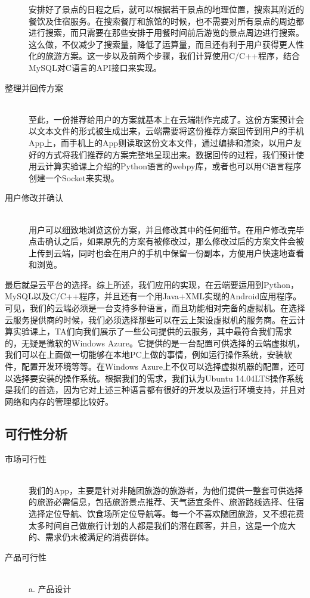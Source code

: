 \documentclass[12pt,a4paper]{article}
\begin{document}
\begin{CJK}{UTF8}{gbsn}
\begin{description}
	安排好了景点的日程之后，就可以根据若干景点的地理位置，搜索其附近的餐饮及住宿服务。在搜索餐厅和旅馆的时候，也不需要对所有景点的周边都进行搜索，而只需要在那些安排于用餐时间前后游览的景点周边进行搜索。这么做，不仅减少了搜索量，降低了运算量，而且还有利于用户获得更人性化的旅游方案。这一步以及前两个步骤，我们计算使用C{\slash}C++程序，结合MySQL对C语言的API接口来实现。
	\item[整理并回传方案] \hfill \\
	至此，一份推荐给用户的方案就基本上在云端制作完成了。这份方案预计会以文本文件的形式被生成出来，云端需要将这份推荐方案回传到用户的手机App上，而手机上的App则读取这份文本文件，通过编排和渲染，以用户友好的方式将我们推荐的方案完整地呈现出来。数据回传的过程，我们预计使用云计算实验课上介绍的Python语言的webpy库，或者也可以用C语言程序创建一个Socket来实现。
	\item[用户修改并确认] \hfill \\
	用户可以细致地浏览这份方案，并且修改其中的任何细节。在用户修改完毕点击确认之后，如果原先的方案有被修改过，那么修改过后的方案文件会被上传到云端，同时也会在用户的手机中保留一份副本，方便用户快速地查看和浏览。
	\end{description}

	最后就是云平台的选择。综上所述，我们应用的实现，在云端要运用到Python，MySQL以及C{\slash}C++程序，并且还有一个用Java+XML实现的Android应用程序。可见，我们的云端必须是一台支持多种语言，而且功能相对完备的虚拟机。在选择云服务提供商的时候，我们必须选择那些可以在云上架设虚拟机的服务商。在云计算实验课上，TA们向我们展示了一些公司提供的云服务，其中最符合我们需求的，无疑是微软的Windows Azure。它提供的是一台配置可供选择的云端虚拟机，我们可以在上面做一切能够在本地PC上做的事情，例如运行操作系统，安装软件，配置开发环境等等。在Windows Azure上不仅可以选择虚拟机器的配置，还可以选择要安装的操作系统。根据我们的需求，我们认为Ubuntu 14.04LTS操作系统是我们的首选，因为它对上述三种语言都有很好的开发以及运行环境支持，并且对网络和内存的管理都比较好。
	
	\subsection{可行性分析}
	\begin{description}
	\item[市场可行性] \hfill \\
	我们的App，主要是针对非随团旅游的旅游者，为他们提供一整套可供选择的旅游必需信息，包括旅游景点推荐、天气适宜条件、旅游路线选择、住宿选择定位导航、饮食场所定位导航等。每一个不喜欢随团旅游，又不想花费太多时间自己做旅行计划的人都是我们的潜在顾客，并且，这是一个庞大的、需求仍未被满足的消费群体。
	\item[产品可行性] \hfill \\
	a. 产品设计


\end{description}
\end{CJK}
\end{document}

